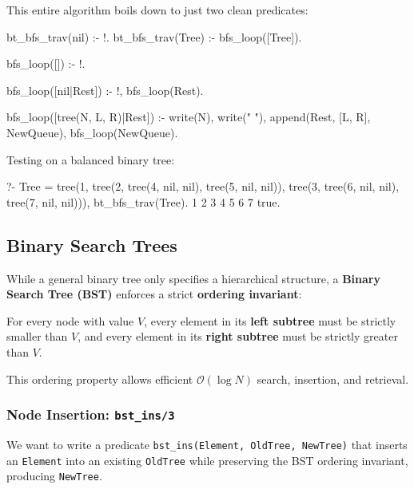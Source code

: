 


This entire algorithm boils down to just two clean predicates:
\begin{codeblock}
bt_bfs_trav(nil) :- !.
bt_bfs_trav(Tree) :-
    bfs_loop([Tree]).

bfs_loop([]) :- !.

bfs_loop([nil|Rest]) :- !,
    bfs_loop(Rest).

bfs_loop([tree(N, L, R)|Rest]) :-
    write(N), write(" "),
    append(Rest, [L, R], NewQueue),
    bfs_loop(NewQueue).
\end{codeblock}

\begin{example}{}
Testing on a balanced binary tree:
\begin{codeblock}
?- Tree = tree(1, 
               tree(2, tree(4, nil, nil), tree(5, nil, nil)), 
               tree(3, tree(6, nil, nil), tree(7, nil, nil))),
   bt_bfs_trav(Tree).
1 2 3 4 5 6 7 
true.
\end{codeblock}
\end{example}



\newpage
\subsection{Binary Search Trees}
While a general binary tree only specifies a hierarchical structure, a \textbf{Binary Search Tree (BST)} enforces a strict \textbf{ordering invariant}:

For every node with value $V$, every element in its \textbf{left subtree} must be strictly smaller than $V$, and every element in its \textbf{right subtree} must be strictly greater than $V$.

This ordering property allows efficient $\mathcal{O}(\log N)$ search, insertion, and retrieval.
\subsubsection*{Node Insertion: \texttt{bst\_ins/3}}
We want to write a predicate \texttt{bst\_ins(Element, OldTree, NewTree)} that inserts an \texttt{Element} into an existing \texttt{OldTree} while preserving the BST ordering invariant, producing \texttt{NewTree}.

